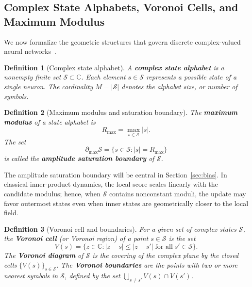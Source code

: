 \documentclass[10pt,journal,letterpaper]{IEEEtran}
\newtheorem{definition}{Definition}
\begin{document}
\subsection{Complex State Alphabets, Voronoi Cells, and Maximum Modulus}

We now formalize the geometric structures that govern discrete complex-valued neural networks~\cite{aurenhammer2013voronoi}.

\begin{definition}[Complex state alphabet]
A \textbf{complex state alphabet} is a nonempty finite set
$\mathcal{S} \subset \mathbb{C}$. Each element $s\in\mathcal{S}$ represents a
possible state of a single neuron. The cardinality $M = |\mathcal{S}|$ denotes the
alphabet size, or number of symbols.
\end{definition}

\begin{definition}[Maximum modulus and saturation boundary]
\label{def:maximum_modulus}
The \textbf{maximum modulus} of a state alphabet is
\begin{equation}
    R_{\max} = \max_{s \in \mathcal{S}} |s|.
\end{equation}
The set
\begin{equation}
    \partial_{\max}\mathcal{S}
    = \bigl\{s\in\mathcal{S}: |s|=R_{\max}\bigr\}
\end{equation}
is called the \textbf{amplitude saturation boundary} of $\mathcal{S}$.
\end{definition}

The amplitude saturation boundary will be central in Section~\ref{sec:bias}. In
classical inner-product dynamics, the local score scales linearly with the
candidate modulus; hence, when $\mathcal{S}$ contains nonconstant moduli, the
update may favor outermost states even when inner states are geometrically closer
to the local field.

\begin{definition}[Voronoi cell and boundaries]
For a given set of complex states $\mathcal{S}$, the \textbf{Voronoi cell} (or Voronoi 
region) of a point $s \in \mathcal{S}$ is the set
\begin{equation}
    V(s) = \bigl\{ z \in \mathbb{C} : |z - s| \le |z - s'| 
           \;\text{for all}\; s' \in \mathcal{S} \bigr\}.
\end{equation}
The \textbf{Voronoi diagram} of $\mathcal{S}$ is the covering of the complex 
plane by the closed cells $\{V(s)\}_{s\in\mathcal{S}}$. The \textbf{Voronoi boundaries}
are the points with two or more nearest symbols in $\mathcal{S}$, defined by
the set $\bigcup_{s\neq s'} V(s)\cap V(s')$.
\end{definition}
\end{document}
